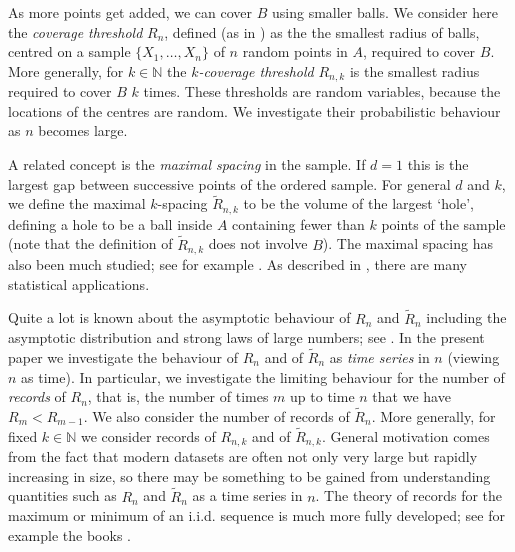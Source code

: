 \documentclass[12pt]{article}
\newcommand{\N}{\mathbb{N}}
\newcommand{\tR}{{\tilde{R}}}
\begin{document}
As more points get added, we can cover $B$
using smaller balls. We consider here the {\em coverage threshold} $R_n$,
defined (as in \cite{MPCov}) as the  the smallest radius of balls, centred on a
 sample $\{X_1,\ldots,X_n\}$ of $n$ random points in $A$, required 
to cover $B$. More generally, for $k \in \N$
 the {\em $k$-coverage threshold} $R_{n,k}$
is the smallest radius required to cover $B$ $k$ times. 
These thresholds are random variables, because the locations of
the centres are random.
We investigate their probabilistic behaviour 
as $n$ becomes large.

A related concept is the {\em maximal spacing} in the sample.
If $d=1$ this is the largest gap between successive points of the
ordered sample. For general $d$ and $k$, we define the maximal
$k$-spacing $\tR_{n,k}$ to be the volume of the largest `hole', defining
a hole to be a ball inside $A$ containing fewer than $k$ points of the sample
(note that the definition of $\tR_{n,k}$ does not involve $B$).
The maximal spacing has also been much studied; see for example
\cite{Aaron,Deheuvels,Henze,Janson2}. As described in \cite{Aaron},
there are many statistical applications. 



Quite a lot is known about the asymptotic behaviour of $R_n$ and
$\tR_n$
including the asymptotic distribution
and strong laws of large numbers;
see  \cite{MPCov}.
In the present paper we investigate the behaviour of $R_n$ and of
$\tR_n$ as {\em time series} in $n$ (viewing $n$ as time).
In particular, we investigate
the limiting behaviour for the number of {\em records}
of $R_n$, that is, the number
of times $m$ up to time $n$ that we have $R_m < R_{m-1}$.
We also consider the number of records of $\tR_n$.
More generally, for fixed $k \in \mathbb N$ we consider records of $R_{n,k}$
and of $\tR_{n,k}$.
General motivation comes from the fact that modern datasets are often not only very large but rapidly increasing in size, so there may be something to be gained from understanding quantities such as $R_n$ and $\tR_n$ as
a time series in $n$. The theory  of records for the maximum or
minimum of an i.i.d. sequence is much more fully developed; see for example
the books \cite{ANbook,Arnold}.
\end{document}
